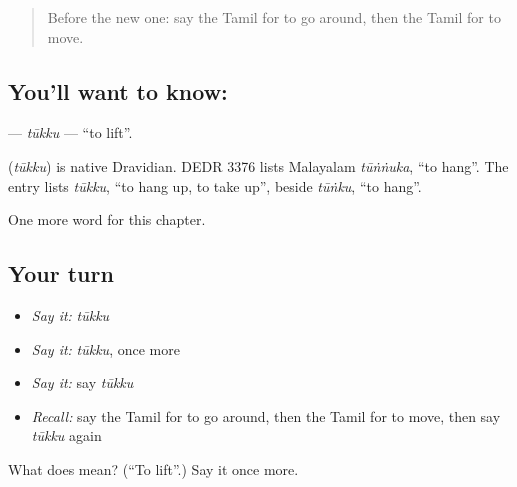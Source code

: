 \label{lesson:TA-C162-tukku}



\begin{quote}
Before the new one: say the Tamil for to go around, then the Tamil for to move.
\end{quote}

\subsection*{You'll want to know: }
\textbf{} — \emph{tūkku} — \textquotedblleft{}to lift\textquotedblright{}.

\begin{cousinweb}
\textbf{} (\emph{tūkku}) is native Dravidian. DEDR 3376 lists Malayalam \emph{tūṅṅuka}, \textquotedblleft{}to hang\textquotedblright{}. The entry lists \emph{tūkku}, \textquotedblleft{}to hang up, to take up\textquotedblright{}, beside \emph{tūṅku}, \textquotedblleft{}to hang\textquotedblright{}.
\end{cousinweb}

\begin{grammarlens}[title={What you've built}]
One more word for this chapter.
\end{grammarlens}

\subsection*{Your turn}
\begin{itemize}
\raggedright
  \item \emph{Say it:} \emph{tūkku}
  \item \emph{Say it:} \emph{tūkku}, once more
  \item \emph{Say it:} say \emph{tūkku}
  \item \emph{Recall:} say the Tamil for to go around, then the Tamil for to move, then say \emph{tūkku} again
\end{itemize}

\begin{tcolorbox}[breakable,colback=teal!4,colframe=teal!35!black,title={Before you move on}]
What does  mean? (\textquotedblleft{}To lift\textquotedblright{}.) Say it once more.
\end{tcolorbox}
